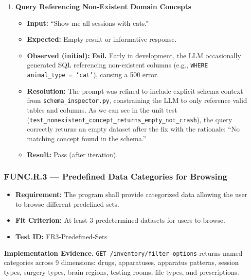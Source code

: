 \documentclass[12pt, titlepage]{article}
\begin{document}
\begin{enumerate}[label=\textbf{FR2-T\arabic*:}, leftmargin=*, labelsep=1em]
  \item \textbf{Query Referencing Non-Existent Domain Concepts}
  \begin{itemize}
    \item \textbf{Input:} ``Show me all sessions with cats.''
    \item \textbf{Expected:} Empty result or informative response.
    \item \textbf{Observed (initial):} \textbf{Fail.} Early in development, the LLM occasionally generated SQL referencing non-existent columns (e.g., \texttt{WHERE animal\_type = `cat'}), causing a 500 error.
    \item \textbf{Resolution:} The prompt was refined to include explicit schema context from \texttt{schema\_\allowbreak{}inspector.py}, 
      constraining the LLM to only reference valid tables and columns. As we can see in the unit test 
      (\texttt{test\_\allowbreak{}nonexistent\_\allowbreak{}concept\_\allowbreak{}returns\_\allowbreak{}empty\_\allowbreak{}not\_\allowbreak{}crash}), 
      the query correctly returns an empty dataset after the fix with the rationale: ``No matching concept found in the schema.''
    \item \textbf{Result:} Pass (after iteration).
  \end{itemize}

\end{enumerate}

\subsubsection{FUNC.R.3 --- Predefined Data Categories for Browsing}

\begin{itemize}
  \item \textbf{Requirement:} The program shall provide categorized data allowing the user to browse different predefined sets.
  \item \textbf{Fit Criterion:} At least 3 predetermined datasets for users to browse.
  \item \textbf{Test ID:} FR3-Predefined-Sets
\end{itemize}

\noindent\textbf{Implementation Evidence.}
\texttt{GET /inventory/filter-options} returns named categories across 9 dimensions: drugs, apparatuses,
apparatus patterns, session types, surgery types, brain regions, testing rooms, file types, and prescriptions.
\end{document}
